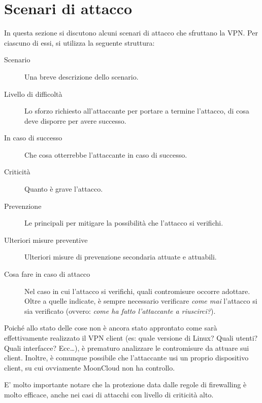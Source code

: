 \section{Scenari di attacco}\label{sec:attacks}

In questa sezione si discutono alcuni scenari di attacco
che sfruttano la VPN.
Per ciascuno di essi, si utilizza la seguente struttura:
\begin{description}
    \item[Scenario]Una breve descrizione dello scenario.
    \item[Livello di difficoltà]Lo sforzo richiesto all'attaccante
    per portare a termine l'attacco, di cosa deve disporre per avere
    successo.
    \item[In caso di successo]Che cosa otterrebbe l'attaccante
    in caso di successo.
    \item[Criticità]Quanto è grave l'attacco.
    \item[Prevenzione]Le principali 
    per mitigare la possibilità che l'attacco si verifichi.
    \item[Ulteriori misure preventive]Ulteriori misure
    di prevenzione secondaria attuate e attuabili.
    \item[Cosa fare in caso di attacco]Nel caso in cui
    l'attacco si verifichi, quali contromisure occorre
    adottare. Oltre a quelle indicate, è sempre necessario
    verificare \textit{come mai} l'attacco si sia verificato
    (ovvero: \textit{come ha fatto l'attaccante a riuscirci?}).
\end{description}
Poiché allo stato delle cose non è ancora stato approntato come
sarà effettivamente realizzato il VPN client (es: quale versione
di Linux? Quali utenti? Quali interfacce? Ecc\ldots), è prematuro
analizzare le contromisure da attuare sui client.
Inoltre, è comunque possibile che l'attaccante usi un proprio
dispositivo client, su cui ovviamente MoonCloud non ha controllo.

E' molto importante notare che la protezione data dalle regole di
firewalling è molto efficace, anche nei casi di attacchi con livello
di criticità alto.



